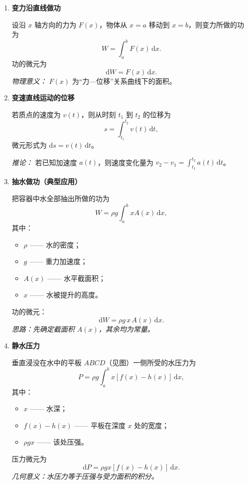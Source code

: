 
\begin{enumerate}
    \item \textbf{变力沿直线做功}

          设沿 $x$ 轴方向的力为 $F(x)$，物体从 $x=a$ 移动到 $x=b$，则变力所做的功为
          $$
              W = \int_{a}^{b} F(x)\,\mathrm{d}x.
          $$
          功的微元为
          $$
              \mathrm{d}W = F(x)\,\mathrm{d}x.
          $$
          \textit{物理意义：} $F(x)$ 为“力—位移”关系曲线下的面积。

          \vspace{0.5em}

    \item \textbf{变速直线运动的位移}

          若质点的速度为 $v(t)$，则从时刻 $t_1$ 到 $t_2$ 的位移为
          $$
              s = \int_{t_1}^{t_2} v(t)\,\mathrm{d}t,
          $$
          微元形式为 $\mathrm{d}s = v(t)\,\mathrm{d}t$。

          \textit{推论：} 若已知加速度 $a(t)$，则速度变化量为 $\displaystyle v_2 - v_1 = \int_{t_1}^{t_2} a(t)\,\mathrm{d}t$。

          \vspace{0.5em}

    \item \textbf{抽水做功（典型应用）}

          把容器中水全部抽出所做的功为
          $$
              W = \rho g \int_{a}^{b} x A(x)\,\mathrm{d}x,
          $$
          其中：
          \begin{itemize}
              \item $\rho$ —— 水的密度；
              \item $g$ —— 重力加速度；
              \item $A(x)$ —— 水平截面积；
              \item $x$ —— 水被提升的高度。
          \end{itemize}
          功的微元：
          $$
              \mathrm{d}W = \rho g\,x\,A(x)\,\mathrm{d}x.
          $$
          \textit{思路：先确定截面积 $A(x)$，其余均为常量。}

          \vspace{0.5em}

    \item \textbf{静水压力}

          垂直浸没在水中的平板 $ABCD$（见图）一侧所受的水压力为
          $$
              P = \rho g \int_{a}^{b} x [f(x) - h(x)]\,\mathrm{d}x,
          $$
          其中：
          \begin{itemize}
              \item $x$ —— 水深；
              \item $f(x)-h(x)$ —— 平板在深度 $x$ 处的宽度；
              \item $\rho g x$ —— 该处压强。
          \end{itemize}
          压力微元为
          $$
              \mathrm{d}P = \rho g x [f(x)-h(x)]\,\mathrm{d}x.
          $$
          \textit{几何意义：水压力等于压强与受力面积的积分。}


\end{enumerate}

